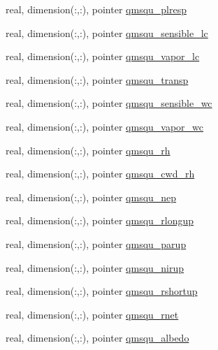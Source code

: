 \begin{DoxyCompactItemize}
\item 
real, dimension(\+:,\+:), pointer \hyperlink{structed__state__vars_1_1edtype_af7a285f7e7ff7d9941612980f8e67ba4}{qmsqu\+\_\+plresp}
\item 
real, dimension(\+:,\+:), pointer \hyperlink{structed__state__vars_1_1edtype_a599f7de8deb42da2ba2d5bf0830a4c3b}{qmsqu\+\_\+sensible\+\_\+lc}
\item 
real, dimension(\+:,\+:), pointer \hyperlink{structed__state__vars_1_1edtype_ae4e95834e94b32f1f20938a95dab4989}{qmsqu\+\_\+vapor\+\_\+lc}
\item 
real, dimension(\+:,\+:), pointer \hyperlink{structed__state__vars_1_1edtype_a2657219d2f84305ec4d1617b9f500b68}{qmsqu\+\_\+transp}
\item 
real, dimension(\+:,\+:), pointer \hyperlink{structed__state__vars_1_1edtype_abb59eae34377c5a4934ab541fe73e0d1}{qmsqu\+\_\+sensible\+\_\+wc}
\item 
real, dimension(\+:,\+:), pointer \hyperlink{structed__state__vars_1_1edtype_a3cefead55150263056fb8e78e7e46457}{qmsqu\+\_\+vapor\+\_\+wc}
\item 
real, dimension(\+:,\+:), pointer \hyperlink{structed__state__vars_1_1edtype_a90dfa626177189bc8987a288cbffd373}{qmsqu\+\_\+rh}
\item 
real, dimension(\+:,\+:), pointer \hyperlink{structed__state__vars_1_1edtype_a420013a7d1b07008b22af35d4c02b6f1}{qmsqu\+\_\+cwd\+\_\+rh}
\item 
real, dimension(\+:,\+:), pointer \hyperlink{structed__state__vars_1_1edtype_a47d0a4372986a12c12118ce94a02a9f1}{qmsqu\+\_\+nep}
\item 
real, dimension(\+:,\+:), pointer \hyperlink{structed__state__vars_1_1edtype_ad75ca6903bdc8dc47901d206a6e2144b}{qmsqu\+\_\+rlongup}
\item 
real, dimension(\+:,\+:), pointer \hyperlink{structed__state__vars_1_1edtype_a360c0605f3a26173ae47a4e05e0510d3}{qmsqu\+\_\+parup}
\item 
real, dimension(\+:,\+:), pointer \hyperlink{structed__state__vars_1_1edtype_a625e332e9269b4139010ca434033ea80}{qmsqu\+\_\+nirup}
\item 
real, dimension(\+:,\+:), pointer \hyperlink{structed__state__vars_1_1edtype_a6b51d0e6d9c6df91ca33b79c870a9db9}{qmsqu\+\_\+rshortup}
\item 
real, dimension(\+:,\+:), pointer \hyperlink{structed__state__vars_1_1edtype_abb6acfdf77faac63548ec4e8ad3ebce2}{qmsqu\+\_\+rnet}
\item 
real, dimension(\+:,\+:), pointer \hyperlink{structed__state__vars_1_1edtype_ac97fa7777771a094cad27378caace909}{qmsqu\+\_\+albedo}

\end{DoxyCompactItemize}
